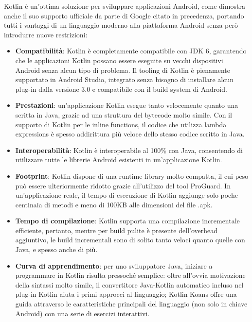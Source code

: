 Kotlin è un'ottima soluzione per sviluppare applicazioni Android, come dimostra anche il suo supporto ufficiale da parte di Google citato in precedenza, portando tutti i vantaggi di un linguaggio moderno alla piattaforma Android senza però introdurre nuove restrizioni:
\begin{itemize}
  \item {\bfseries Compatibilità}: Kotlin è completamente compatibile con JDK 6, garantendo che le applicazioni Kotlin possano essere eseguite su vecchi dispositivi Android senza alcun tipo di problema. Il tooling di Kotlin è pienamente supportato in Android Studio, integrato senza bisogno di installare alcun plug-in dalla versione 3.0 e compatibile con il build system di Android.
  \item {\bfseries Prestazioni}: un'applicazione Kotlin esegue tanto velocemente quanto una scritta in Java, grazie ad una struttura del bytecode molto simile. Con il supporto di Kotlin per le inline functions, il codice che utilizza lambda expressions è spesso addirittura più veloce dello stesso codice scritto in Java.
  \item {\bfseries Interoperabilità}:  Kotlin è interoperabile al 100\% con Java, consentendo di utilizzare tutte le librerie Android esistenti in un'applicazione Kotlin.
  \item {\bfseries Footprint}: Kotlin dispone di una runtime library molto compatta, il cui peso può essere ulteriormente ridotto grazie all'utilizzo del tool ProGuard. In un'applicazione reale, il tempo di esecuzione di Kotlin aggiunge solo poche centinaia di metodi e meno di 100KB alle dimensioni del file .apk.
  \item {\bfseries Tempo di compilazione}: Kotlin supporta una compilazione incrementale efficiente, pertanto, mentre per build pulite è presente dell’overhead aggiuntivo, le build incrementali sono di solito tanto veloci quanto quelle con Java, e spesso anche di più.
  \item {\bfseries Curva di apprendimento}: per uno sviluppatore Java, iniziare a programmare in Kotlin risulta pressoché semplice: oltre all’ovvia motivazione della sintassi molto simile, il convertitore Java-Kotlin automatico incluso nel plug-in Kotlin aiuta i primi approcci al linguaggio; Kotlin Koans offre una guida attraverso le caratteristiche principali del linguaggio (non solo in chiave Android) con una serie di esercizi interattivi.\\
\end{itemize}

